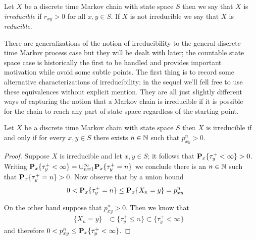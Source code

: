 \begin{defn}Let $X$ be a discrete time Markov chain with state space
  $S$ then we say that $X$ is \emph{irreducible} if $r_{xy} > 0$ for
  all $x,y \in S$.  If $X$ is not irreducible we say that $X$ is \emph{reducible}.
\end{defn}

There are generalizations of the notion of irreducibility to the
general discrete time Markov process case but they will be dealt with
later; the countable state space case is historically the first to be
handled and provides important motivation while avoid some subtle
points.  The first thing is to record some alternative
characterizations of irreducibility; in the sequel we'll fell free to
use these equivalences without explicit mention.  They are all just
slightly different ways of capturing the notion that a Markov chain is
irreducible if it is possible for the chain to reach any part of state
space regardless of the starting point.

\begin{prop}\label{IrreducibleEquivalencesDiscreteTimeMarkovChain}Let
  $X$ be a discrete time Markov chain with state space $S$ then $X$ is
  irreducible if and only if for every $x,y \in S$ there exists $n \in
  \naturals$ such that $p^n_{xy} > 0$.
\end{prop}
\begin{proof}
Suppose $X$ is irreducible and let $x,y \in S$; it follows that
$\sprobability{\tau^+_y < \infty}{x} > 0$.  Writing
$\sprobability{\tau^+_y < \infty}{x} = \cup_{n=1}^\infty
\sprobability{\tau^+_y = n}{x}$ we conclude there is an $n \in
\naturals$ such that $\sprobability{\tau^+_y = n}{x} > 0$.  Now
observe that by a union bound
\begin{align*}
0 &< \sprobability{\tau^+_y = n}{x} \leq \sprobability{X_n = y}{x} = p^n_{xy}
\end{align*}

On the other hand suppose that $p^n_{xy} > 0$.  Then we know that
\begin{align*}
\lbrace X_n = y \rbrace &\subset \lbrace \tau^+_y \leq n \rbrace
                          \subset \lbrace \tau^+_y < \infty \rbrace
\end{align*}
and therefore $ 0 < p^n_{xy} \leq \sprobability{\tau^+_y < \infty}{x}$.
\end{proof}


